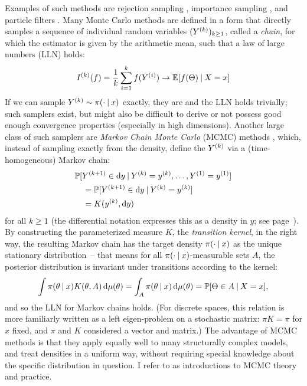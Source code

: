 Examples of such methods are rejection sampling \parencites[chapter
II.3]{devroye1986nonuniform}[section 4]{vihola2020lectures}, importance sampling \parencite[section
4]{vihola2020lectures}, and particle filters \parencite{dahlin2015getting}.  Many Monte Carlo
methods are defined in a form that directly samples a sequence of individual random variables
\((Y^{(k)})_{k \ge 1}\), called a \emph{chain}, for which the estimator is given by the arithmetic
mean, such that a law of large numbers (LLN) holds:
\begin{equation}
  \label{eq:mc-lln}
  \kth{I}(f) = \frac{1}{k} \sum_{i=1}^{k} f(\kth[i]{Y}) \to \Exp{f(\Theta) \given X = x}
\end{equation}
If we can sample \(Y^{(k)} \sim \pi(\cdot \:\vert\: x)\) exactly, they are \iid{} and the LLN holds
trivially; such samplers exist, but might also be difficult to derive or not possess good enough
convergence properties (especially in high dimensions).  Another large class of such samplers are
\emph{Markov Chain Monte Carlo} (MCMC) methods \parencite{vihola2020lectures,robert1999monte},
which, instead of sampling exactly from the density, define the \(Y^{(k)}\) via a (time-homogeneous)
Markov chain:
\begin{equation}
  \label{eq:mc-kernel}
  \begin{aligned}
    &\Prob{\kth[k+1]{Y} \in \dif y
      \given \kth{Y} = \kth{y}, \ldots, \kth[1]{Y} = \kth[1]{y}} \\
    &\quad = \Prob{\kth[k+1]{Y} \in \dif y \given \kth{Y} = \kth{y}}  \\
    &\quad = K(\kth{y}, \dif y) \\
  \end{aligned}
\end{equation}
for all \(k \ge 1\) (the differential notation expresses this as a density in \(y\); see
page~\pageref{cha:notation}).  By constructing the parameterized measure \(K\), the \emph{transition
  kernel}, in the right way, the resulting Markov chain has the target density
\(\pi(\cdot \:\vert\: x)\) as the unique stationary distribution~-- that means for all
\(\pi(\cdot \:\vert\: x)\)-measurable sets \(A\), the posterior distribution is invariant under
transitions according to the kernel:
\begin{equation}
  \label{eq:stationarity}
  \int \pi(\theta \given x) K(\theta, A) \dif\mu(\theta) = \int_A \pi(\theta \given x) \dif\mu(\theta) =
  \Prob{\Theta \in A \given X = x},
\end{equation}
and so the LLN for Markov chains holds.  (For discrete spaces, this relation is more familiarly
written as a left eigen-problem on a stochastic matrix: \(\pi K = \pi\) for \(x\) fixed, and \(\pi\)
and \(K\) considered a vector and matrix.)  The advantage of MCMC methods is that they apply equally
well to many structurally complex models, and treat densities in a uniform way, without requiring
special knowledge about the specific distribution in question.  I refer to \textcites[chapter
6]{vihola2020lectures}{robert1999monte}[chapters 24 and following]{murphy2012machine} as
introductions to MCMC theory and practice.

